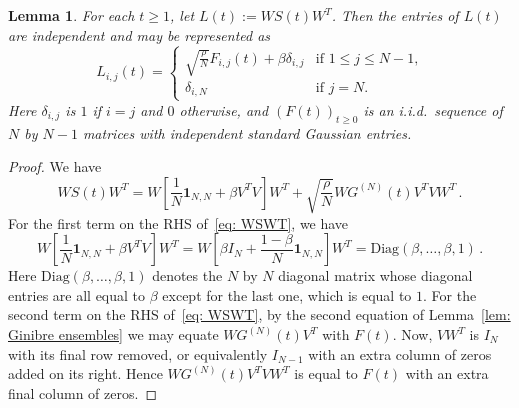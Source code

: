 \documentclass[12pt]{article}
\newtheorem{lemma}{Lemma}
\newcommand{\1}{\mathbf{1}}
\begin{document}
\begin{lemma}\label{lem: L(t)}
For each $t \ge 1$, let $L(t) := W S(t) W^T$. Then the entries of $L(t)$ are independent and may be represented as
$$ L_{i,j}(t) =  \begin{cases}
 \sqrt{\frac{\rho}N} F_{i,j}(t) + \beta \delta_{i,j} & \text{if $1 \le j \le N-1$,}\\
 \delta_{i,N} &\text{if $j = N$.} \end{cases}$$
 Here $\delta_{i,j}$ is $1$ if $i=j$ and $0$ otherwise, and $\left(F(t)\right)_{t \ge 0}$ is an i.i.d.~sequence of $N$ by $N-1$ matrices with independent standard Gaussian entries.
\end{lemma}
\begin{proof}
We have
\begin{equation}\label{eq: WSWT} 
WS(t)W^T   =  W\left[\frac{1}{N}\mathbf{1}_{N,N} + \beta V^T V\right]W^T + \sqrt{\frac{\rho}{N}} W G^{(N)}(t) V^T V W^T\,.
\end{equation}
For the first term on the RHS of~\eqref{eq: WSWT}, we have
$$
W\left[\frac{1}{N}\mathbf{1}_{N,N} + \beta V^T V\right]W^T = W\left[\beta I_N + \frac{1-\beta}{N} \mathbf{1}_{N,N} \right]W^T  = \mathrm{Diag}(\beta, \dots, \beta, 1)\,.
$$
Here $\mathrm{Diag}(\beta, \dots, \beta,1)$ denotes the $N$ by $N$ diagonal matrix whose diagonal entries are all equal to $\beta$ except for the last one, which is equal to $1$. For the second term on the RHS of~\eqref{eq: WSWT}, by the second equation of Lemma~\ref{lem: Ginibre ensembles} we may equate $W G^{(N)}(t)V^T$ with $F(t)$. Now, $VW^T$ is $I_N$ with its final row removed, or equivalently $I_{N-1}$ with an extra column of zeros added on its right.  Hence $WG^{(N)}(t)V^T VW^T$ is equal to $F(t)$ with an extra final column of zeros. 
\end{proof}
\end{document}
